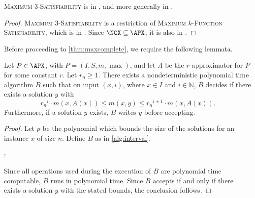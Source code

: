 \documentclass[]{article}
\begin{document}
\begin{theorem}\label{thm:inncx}\label{thm:inapx}
  \textsc{Maximum 3-Satisfiability} is in \NCX, and more generally in \APX.
\end{theorem}
\begin{proof}
  \textsc{Maximum 3-Satisfiability} is a restriction of \textsc{Maximum $k$-Function Satisfiability}, which is in \NCX{} \cite[Corollary~13]{trevisan98}.
  Since $\NCX \subseteq \APX$, it is also in \APX.
\end{proof}

Before proceeding to \autoref{thm:maxcomplete}, we require the following lemmata.

\begin{lemma}\label{lem:interval}
  Let $P \in \APX$, with $P = (I, S, m, \max)$, and let $A$ be the $r$-approximator for $P$ for some constant $r$.
  Let $r_n \geq 1$.
  There exists a nondeterministic polynomial time algorithm $B$ such that on input $(x, i)$, where $x \in I$ and $i \in \mathbb{N}$, $B$ decides if there exists a solution $y$ with
  \begin{equation*}
    {r_n}^i \cdot m(x, A(x)) \leq m(x, y) \leq {r_n}^{i + 1} \cdot m(x, A(x)).
  \end{equation*}
  Furthermore, if a solution $y$ exists, $B$ writes $y$ before accepting.
\end{lemma}
\begin{proof}
  Let $p$ be the polynomial which bounds the size of the solutions for an instance $x$ of size $n$.
  Define $B$ as in \autoref{alg:interval}.
  \begin{algorithm}
    \caption{Nondeterministic polynomial time algorithm that decides if there is an approximate solution for instance $x$ of problem $P$ in interval $i$%
      \label{alg:interval}}
    \begin{algorithmic}[1]
      \Statex{}
      :
        \Else
        \EndIf
      \EndFunction
    \end{algorithmic}
  \end{algorithm}
  Since all operations used during the execution of $B$ are polynomial time computable, $B$ runs in polynomial time.
  Since $B$ accepts if and only if there exists a solution $y$ with the stated bounds, the conclusion follows.
\end{proof}
\end{document}
